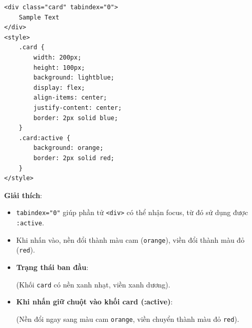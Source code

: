 \documentclass[11pt,oneside]{book}
\newcommand{\codeinline}[1]{\textcolor{accentOrange}{\texttt{#1}}}
\begin{document}
\begin{conceptBox}
\begin{codeWindow}
\begin{lstlisting}[language=HTML5]
<div class="card" tabindex="0">
    Sample Text
</div>
<style>
    .card {
        width: 200px;
        height: 100px;
        background: lightblue;
        display: flex;
        align-items: center;
        justify-content: center;
        border: 2px solid blue;
    }
    .card:active {
        background: orange;
        border: 2px solid red;
    }
</style>
\end{lstlisting}
\end{codeWindow}
\textbf{Giải thích}:
\begin{itemize}[leftmargin=1.5em, itemsep=2pt, parsep=0pt]
    \item \codeinline{tabindex="0"} giúp phần tử \codeinline{<div>} có thể nhận focus, từ đó sử dụng được \codeinline{:active}.
    \item Khi nhấn vào, nền đổi thành màu cam (\codeinline{orange}), viền đổi thành màu đỏ (\codeinline{red}).
\end{itemize}
\end{conceptBox}

\begin{browserWindow}
\sffamily\small
\begin{itemize}[leftmargin=1.5em, itemsep=3pt, parsep=0pt]
    \item \textbf{Trạng thái ban đầu}:
    \par\vspace{2pt}
    \quad (Khối \codeinline{card} có nền xanh nhạt, viền xanh dương).
    \par\vspace{4pt}
    \item \textbf{Khi nhấn giữ chuột vào khối card (:active)}:
    \par\vspace{2pt}
    \quad (Nền đổi ngay sang màu cam \codeinline{orange}, viền chuyển thành màu đỏ \codeinline{red}).
\end{itemize}
\end{browserWindow}
\end{document}
